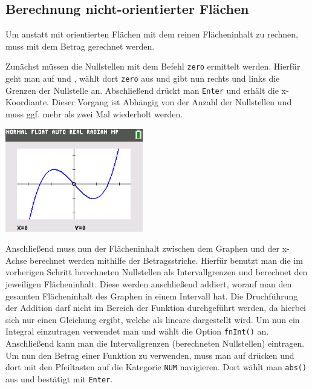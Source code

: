 \subsection{Berechnung nicht-orientierter Flächen}\label{sec:Berechnung nicht-orientierter Flaechen}
Um anstatt mit orientierten Flächen mit dem reinen Flächeninhalt zu rechnen, muss mit dem Betrag gerechnet werden.
\begin{paracol}{2}
\begin{flushleft}
	Zunächst müssen die Nullstellen mit dem Befehl \texttt{zero} ermittelt werden. Hierfür geht man auf  und , wählt dort \texttt{zero} aus und gibt nun rechts und links die Grenzen der Nullstelle an. Abschließend drückt man \texttt{Enter} und erhält die x-Koordiante. Dieser Vorgang ist Abhängig von der Anzahl der Nullstellen und muss ggf. mehr als zwei Mal wiederholt werden. 
\end{flushleft}	
\switchcolumn
\begin{flushright}
			\includegraphics[width=6cm]{Media/GRT/Visualisierung/berechnung_nichtOrientierter_Flacheninhalt/berechnung_nichtOrientierter_Flacheninhalt_1.png}
	\end{flushright}
\end{paracol}
Anschließend muss nun der Flächeninhalt zwischen dem Graphen und der x-Achse berechnet werden mithilfe der Betragsstriche. Hierfür benutzt man die im vorherigen Schritt berechneten Nullstellen als Intervallgrenzen und berechnet den jeweiligen Flächeninhalt. Diese werden anschließend addiert, worauf man den gesamten Flächeninhalt des Graphen in einem Intervall hat. 
	Die Druchführung der Addition darf nicht im Bereich der Funktion durchgeführt werden, da hierbei sich nur einen Gleichung ergibt, welche als lineare dargestellt wird. Um nun ein Integral einzutragen verwendet man  und wählt die Option \texttt{fnInt()} an. Anschließend kann man die Intervallgrenzen (berechneten Nullstellen) eintragen. Um nun den Betrag einer Funktion zu verwenden, muss man auf  drücken und dort mit den Pfeiltasten auf die Kategorie \texttt{NUM} navigieren. Dort wählt man \texttt{abs()} aus und bestätigt mit \texttt{Enter}. 
\pagebreak
